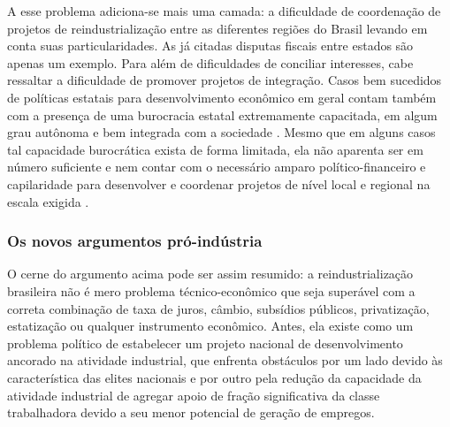A esse problema adiciona-se mais uma camada: a dificuldade de
coordenação de projetos de reindustrialização entre as diferentes
regiões do Brasil levando em conta suas particularidades. As já citadas
disputas fiscais entre estados são apenas um exemplo. Para além de
dificuldades de conciliar interesses, cabe ressaltar a dificuldade de
promover projetos de integração. Casos bem sucedidos de políticas
estatais para desenvolvimento econômico em geral contam também com a
presença de uma burocracia estatal extremamente capacitada, em algum
grau autônoma e bem integrada com a sociedade \citep{evans_embedded_1995}. Mesmo que
em alguns casos tal capacidade burocrática exista de forma limitada, ela
não aparenta ser em número suficiente e nem contar com o necessário
amparo político-financeiro e capilaridade para desenvolver e coordenar
projetos de nível local e regional na escala exigida \citep{evans_embedded_1995}.

\subsubsection{Os novos argumentos pró-indústria}

O cerne do argumento acima pode ser assim resumido: a reindustrialização
brasileira não é mero problema técnico-econômico que seja superável com
a correta combinação de taxa de juros, câmbio, subsídios públicos,
privatização, estatização ou qualquer instrumento econômico. Antes, ela
existe como um problema político de estabelecer um projeto nacional de
desenvolvimento ancorado na atividade industrial, que enfrenta
obstáculos por um lado devido às característica das elites nacionais e
por outro pela redução da capacidade da atividade industrial de agregar
apoio de fração significativa da classe trabalhadora devido a seu menor
potencial de geração de empregos.

